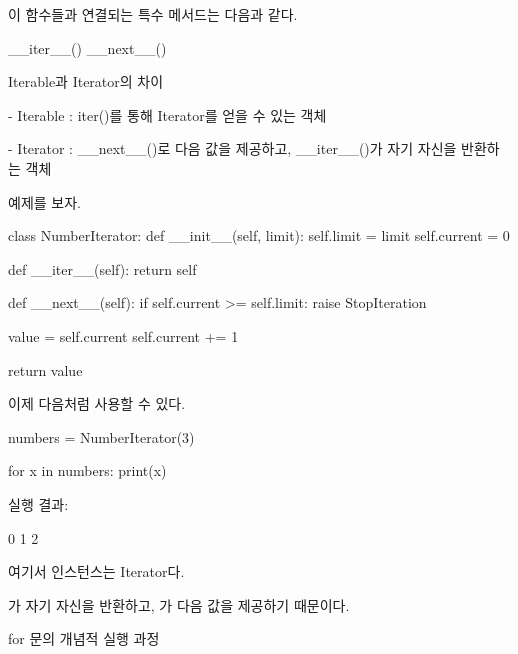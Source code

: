 이 함수들과 연결되는 특수 메서드는 다음과 같다.

\begin{dhkcode}
__iter__()
__next__()
\end{dhkcode}

\begin{dhknote}
\begin{dhksmry}[centered]
Iterable과 Iterator의 차이
\end{dhksmry}
\end{dhknote}

\begin{dhksmry}
- Iterable : iter()를 통해 Iterator를 얻을 수 있는 객체

- Iterator : __next__()로 다음 값을 제공하고,
            __iter__()가 자기 자신을 반환하는 객체
\end{dhksmry}

예제를 보자.

\begin{dhkcode}
class NumberIterator:
    def __init__(self, limit):
        self.limit = limit
        self.current = 0

    def __iter__(self):
        return self

    def __next__(self):
        if self.current >= self.limit:
            raise StopIteration

        value = self.current
        self.current += 1

        return value
\end{dhkcode}

이제 다음처럼 사용할 수 있다.

\begin{dhkcode}
numbers = NumberIterator(3)

for x in numbers:
    print(x)
\end{dhkcode}

실행 결과:

\begin{dhkzsh}
0
1
2
\end{dhkzsh}

여기서  인스턴스는 Iterator다.

가 자기 자신을 반환하고, 가 다음 값을 제공하기 때문이다.

\begin{dhknote}
\begin{dhksmry}[centered]
for 문의 개념적 실행 과정
\end{dhksmry}
\end{dhknote}

